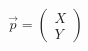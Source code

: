 \documentclass[preview]{standalone}
\begin{document}
\begin{align*}
\vec{p} = \begin{pmatrix}  X  \\  Y  \end{pmatrix}
\end{align*}
\end{document}
